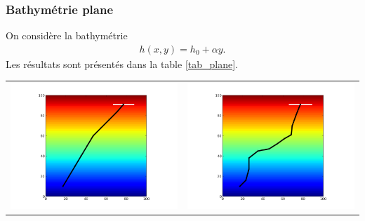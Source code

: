 \subsubsection{Bathymétrie plane}
On considère la bathymétrie
\begin{align*}
h(x,y)=h_0 + \alpha y.
\end{align*}
 Les résultats sont présentés dans la table \ref{tab_plane}.
\begin{table}
\begin{tabular}{cc}
\includegraphics[scale=0.42]{../data/greedy_plane_2/plot_A_10_17_B_91_77_iteration_010.png} &
\includegraphics[scale=0.42]{../data/anneaux_plane_2/plot_A_10_17_B_91_77_iteration_011.png} \\

\end{tabular}
\end{table}
